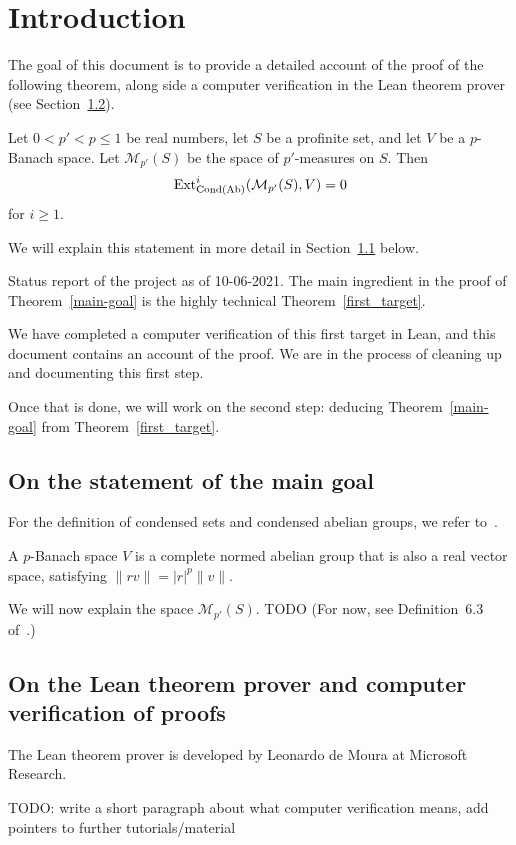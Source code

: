\section{Introduction}
\label{intro}

The goal of this document is to provide a detailed account
of the proof of the following theorem,
along side a computer verification in the Lean theorem prover
(see Section~\ref{on-lean}).

\begin{theoremx}
  \label{main-goal}
  Let $0 < p' < p \le 1$ be real numbers,
  let $S$ be a profinite set,
  and let $V$ be a $p$-Banach space.
  Let $\mathcal M_{p'}(S)$ be the space of $p'$-measures on $S$.
  Then
  \[
    \operatorname{Ext}^i_{\operatorname{Cond}(\operatorname{Ab})}(\mathcal M_{p'}(S), V)=0
  \]
  for $i \ge 1$.
\end{theoremx}

We will explain this statement in more detail in Section~\ref{on-the-statement} below.

\begin{remark}
  Status report of the project as of 10-06-2021.
  The main ingredient in the proof of Theorem~\ref{main-goal}
  is the highly technical Theorem~\ref{first_target}.

  We have completed a computer verification of this first target in Lean,
  and this document contains an account of the proof.
  We are in the process of cleaning up and documenting this first step.

  Once that is done, we will work on the second step:
  deducing Theorem~\ref{main-goal} from Theorem~\ref{first_target}.
\end{remark}

\subsection{On the statement of the main goal}
\label{on-the-statement}

For the definition of condensed sets and condensed abelian groups,
we refer to~\cite{Condensed}.

A $p$-Banach space $V$ is a complete normed abelian group
that is also a real vector space,
satisfying $\|rv\| = |r|^p\|v\|$.

We will now explain the space $\mathcal M_{p'}(S)$.
TODO
(For now, see Definition~6.3 of~\cite{Analytic}.)

\subsection{On the Lean theorem prover and computer verification of proofs}
\label{on-lean}

The Lean theorem prover is developed by Leonardo de Moura
at Microsoft Research.

TODO: write a short paragraph about what computer verification means,
add pointers to further tutorials/material

